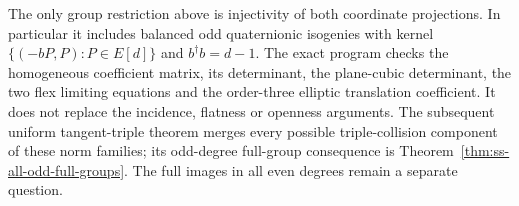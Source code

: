 \begin{remark}
The only group restriction above is injectivity of both coordinate
projections. In particular it includes balanced odd quaternionic
isogenies with kernel $\{(-bP,P):P\in E[d]\}$ and
$b^\dagger b=d-1$. The exact program
checks the homogeneous coefficient matrix, its determinant, the
plane-cubic determinant, the two flex limiting equations and the
order-three elliptic translation coefficient. It does not replace
the incidence, flatness or openness arguments. The subsequent uniform
tangent-triple theorem merges every possible triple-collision component
of these norm families; its odd-degree full-group consequence is
Theorem~\ref{thm:ss-all-odd-full-groups}. The full images in all even
degrees remain a separate question.
\end{remark}
